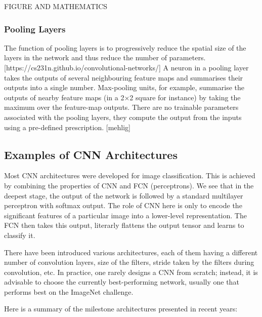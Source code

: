 FIGURE AND MATHEMATICS

\subsubsection{Pooling Layers}

The function of pooling layers is to progressively reduce the spatial size of the layers in the network and thus reduce the number of parameters. [https://cs231n.github.io/convolutional-networks/] A neuron in a pooling layer takes the outputs of several neighbouring feature maps and summarises their outputs into a single number. Max-pooling units, for example, summarise the outputs of nearby feature maps (in a 2×2 square for instance) by taking the maximum over the feature-map outputs. There are no trainable parameters associated with the pooling layers, they compute the output from the inputs using a pre-defined prescription. [mehlig]

\subsection{Examples of CNN Architectures}

Most CNN architectures were developed for image classification. This is achieved by combining the properties of CNN and FCN (perceptrons). We see that in the deepest stage, the output of the network is followed by a standard multilayer perceptron with softmax output. The role of CNN here is only to encode the significant features of a particular image into a lower-level representation. The FCN then takes this output, literarly flattens the output tensor and learns to classify it.

There have been introduced various architectures, each of them having a different number of convolution layers, size of the filters, stride taken by the filters during convolution, etc. In practice, one rarely designs a CNN from scratch; instead, it is advisable to choose the currently best-performing network, usually one that performs best on the ImageNet challenge.

Here is a summary of the milestone architectures presented in recent years:

